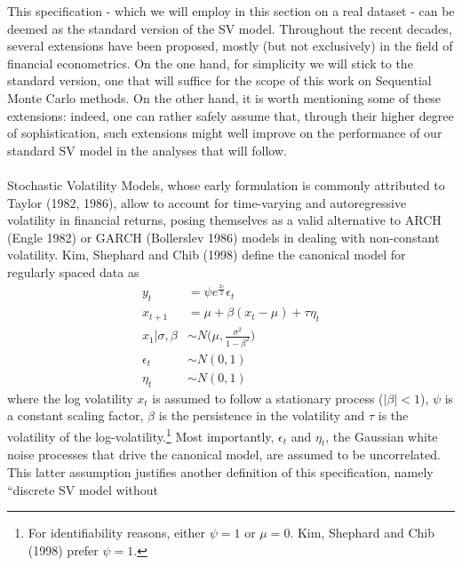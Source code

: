 \documentclass[
]{book}
\theoremstyle{break}
\theoremstyle{nonumberplain}
\begin{document}
This specification - which we will employ in this section on a real
dataset - can be deemed as the standard version of the SV model.
Throughout the recent decades, several extensions have been proposed,
mostly (but not exclusively) in the field of financial econometrics. On
the one hand, for simplicity we will stick to the standard version, one
that will suffice for the scope of this work on Sequential Monte Carlo
methods. On the other hand, it is worth mentioning some of these
extensions: indeed, one can rather safely assume that, through their
higher degree of sophistication, such extensions might well improve on
the performance of our standard SV model in the analyses that will
follow.\\
~\\
Stochastic Volatility Models, whose early formulation is commonly
attributed to Taylor (1982, 1986), allow to account for time-varying and
autoregressive volatility in financial returns, posing themselves as a
valid alternative to ARCH (Engle 1982) or GARCH (Bollerslev 1986) models
in dealing with non-constant volatility. Kim, Shephard and Chib (1998)
define the canonical model for regularly spaced data as \begin{align*}
    y_t & = \psi e^{\frac{x_t}{2}}\epsilon_t\\
    x_{t+1} & = \mu+\beta(x_t-\mu)+\tau \eta_t\\
    x_1|\sigma,\beta & \sim  N\Big(\mu,\frac{\sigma^2}{1-\beta^2}\Big)\\
    \epsilon_t & \sim N(0,1)\\ 
    \eta_t & \sim N(0,1)
\end{align*} where the log volatility \(x_t\) is assumed to follow a
stationary process (\(|\beta|<1\)), \(\psi\) is a constant scaling
factor, \(\beta\) is the persistence in the volatility and \(\tau\) is
the volatility of the
log-volatility.\footnote{For identifiability reasons, either $\psi=1$ or $\mu=0$. Kim, Shephard and Chib (1998) prefer $\psi=1$.}
Most importantly, \(\epsilon_t\) and \(\eta_t\), the Gaussian white
noise processes that drive the canonical model, are assumed to be
uncorrelated. This latter assumption justifies another definition of
this specification, namely ``discrete SV model without
\end{document}

